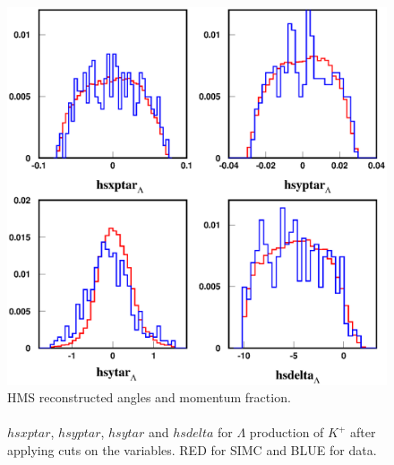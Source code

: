 \begin{figure}[!tbp]
  \centering
  \includegraphics[width=0.8\columnwidth]{com_plot_2_hms_2}
  \caption[HMS reconstructed angles and momentum fraction.]{\label{fig:com_plot_2_hms_2}HMS reconstructed angles and momentum fraction.\\\\ $hsxptar$, $hsyptar$, $hsytar$ and $hsdelta$ for $\Lambda$ production of $K^+$ after applying cuts on the variables. RED for SIMC and BLUE for data.}
\end{figure}

